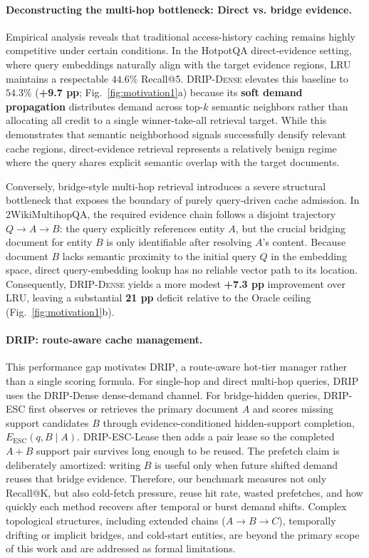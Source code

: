 \paragraph{Deconstructing the multi-hop bottleneck: Direct vs. bridge evidence.} 
Empirical analysis reveals that traditional access-history caching remains highly competitive under certain conditions. In the HotpotQA direct-evidence setting, where query embeddings naturally align with the target evidence regions, \textsc{LRU} maintains a respectable $44.6\%$ Recall@5. \textsc{DRIP-Dense} elevates this baseline to $54.3\%$ (\textbf{+9.7 pp}; Fig.~\ref{fig:motivation1}a) because its \textbf{soft demand propagation} distributes demand across top-$k$ semantic neighbors rather than allocating all credit to a single winner-take-all retrieval target. While this demonstrates that semantic neighborhood signals successfully densify relevant cache regions, direct-evidence retrieval represents a relatively benign regime where the query shares explicit semantic overlap with the target documents.

Conversely, bridge-style multi-hop retrieval introduces a severe structural bottleneck that exposes the boundary of purely query-driven cache admission. In 2WikiMultihopQA, the required evidence chain follows a disjoint trajectory $Q \rightarrow A \rightarrow B$: the query explicitly references entity $A$, but the crucial bridging document for entity $B$ is only identifiable after resolving $A$'s content. Because document $B$ lacks semantic proximity to the initial query $Q$ in the embedding space, direct query-embedding lookup has no reliable vector path to its location. Consequently, \textsc{DRIP-Dense} yields a more modest \textbf{+7.3 pp} improvement over \textsc{LRU}, leaving a substantial \textbf{21 pp} deficit relative to the Oracle ceiling (Fig.~\ref{fig:motivation1}b).

\paragraph{DRIP: route-aware cache management.} This performance gap motivates \textsc{DRIP}, a route-aware hot-tier manager rather than a single scoring formula. For single-hop and direct multi-hop queries, DRIP uses the DRIP-Dense dense-demand channel. For bridge-hidden queries, DRIP-ESC first observes or retrieves the primary document $A$ and scores missing support candidates $B$ through evidence-conditioned hidden-support completion, $E_{\mathrm{ESC}}(q,B\mid A)$. DRIP-ESC-Lease then adds a pair lease so the completed $A{+}B$ support pair survives long enough to be reused. The prefetch claim is deliberately amortized: writing $B$ is useful only when future shifted demand reuses that bridge evidence. Therefore, our benchmark measures not only Recall@K, but also cold-fetch pressure, reuse hit rate, wasted prefetches, and how quickly each method recovers after temporal or burst demand shifts. Complex topological structures, including extended chains ($A\!\rightarrow\!B\!\rightarrow\!C$), temporally drifting or implicit bridges, and cold-start entities, are beyond the primary scope of this work and are addressed as formal limitations.

